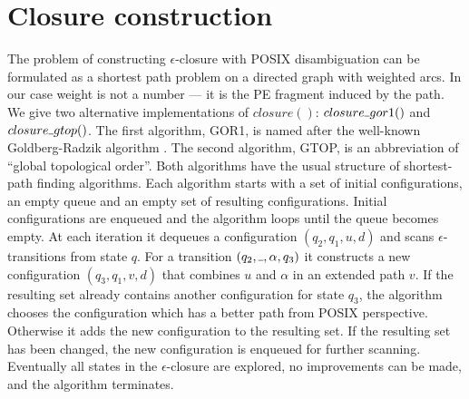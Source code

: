\documentclass[AMA,STIX1COL]{WileyNJD-v2}
\newcommand{\Xund}{\rule{.4em}{.4pt}}
\begin{document}
\section{Closure construction}\label{section_closure}

The problem of constructing $\epsilon$-closure with POSIX disambiguation
can be formulated as a shortest path problem on a directed graph with weighted arcs.
In our case weight is not a number --- it is the PE fragment induced by the path.
%
We give two alternative implementations of $closure()$: $closure \Xund gor1()$ and $closure \Xund gtop()$.
The first algorithm, GOR1, is named after the well-known Goldberg-Radzik algorithm \cite{GR93}.
The second algorithm, GTOP, is an abbreviation of ``global topological order''.
%
Both algorithms have the usual structure of shortest-path finding algorithms.
Each algorithm starts with a set of initial configurations, an empty queue and an empty set of resulting configurations.
Initial configurations are enqueued and the algorithm loops until the queue becomes empty.
At each iteration it dequeues a configuration $(q_2, q_1, u, d)$ and scans $\epsilon$-transitions from state $q$.
For a transition $(q_2, \Xund, \alpha, q_3)$ it constructs a new configuration $(q_3, q_1, v, d)$
that combines $u$ and $\alpha$ in an extended path $v$.
If the resulting set already contains another configuration for state $q_3$,
the algorithm chooses the configuration which has a better path from POSIX perspective.
Otherwise it adds the new configuration to the resulting set.
If the resulting set has been changed, the new configuration is enqueued for further scanning.
Eventually all states in the $\epsilon$-closure are explored, no improvements can be made, and the algorithm terminates.
%
\\
\end{document}
